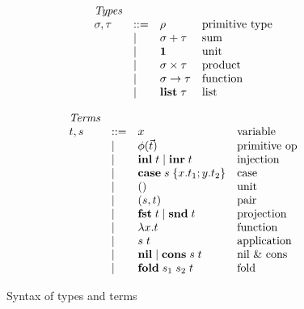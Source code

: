 \begin{figure}
  \begin{subfigure}[t]{0.48\linewidth}
  \small
  \[
  \begin{array}{lllll}
    & \textit{Types}
    \\
    &
    \sigma, \tau
    & ::= &
    \rho
    &
    \text{primitive type}
    \\
    && \mid &
    \sigma + \tau
    &
    \text{sum}
    \\
    && \mid &
    \mathbf{1}
    &
    \text{unit}
    \\
    && \mid &
    \sigma \times \tau
    &
    \text{product}
    \\
    && \mid &
    \sigma \to \tau
    &
    \text{function}
    \\
    && \mid &
    \mathbf{list}\;\tau
    &
    \text{list}
  \end{array}
  \]
  \end{subfigure}%
  \begin{subfigure}[t]{0.48\linewidth}
  \small
  \[
  \begin{array}{lllll}
    & \textit{Terms}
    \\
    &
    t, s
    & ::= &
    x
    &
    \text{variable}
    \\
    && \mid &
    \phi(\vec t)
    &
    \text{primitive op}
    \\
    && \mid &
    \mathbf{inl}\;t \mid \mathbf{inr}\;t
    &
    \text{injection}
    \\
    && \mid &
    \mathbf{case}\;s\;\{x.t_1; y.t_2\}
    &
    \text{case}
    \\
    && \mid &
    ()
    &
    \text{unit}
    \\
    && \mid &
    (s,t)
    &
    \text{pair}
    \\
    && \mid &
    \mathbf{fst}\;t \mid \mathbf{snd}\;t
    &
    \text{projection}
    \\
    && \mid &
    \lambda x.t
    &
    \text{function}
    \\
    && \mid &
    s\;t
    &
    \text{application}
    \\
    && \mid &
    \mathbf{nil} \mid \mathbf{cons}\;s\;t
    &
    \text{nil \& cons}
    \\
    && \mid &
    \mathbf{fold}\;s_1\;s_2\;t
    &
    \text{fold}
  \end{array}
  \]
  \end{subfigure}
  \caption{Syntax of types and terms}
  \label{fig:syntax}
\end{figure}
